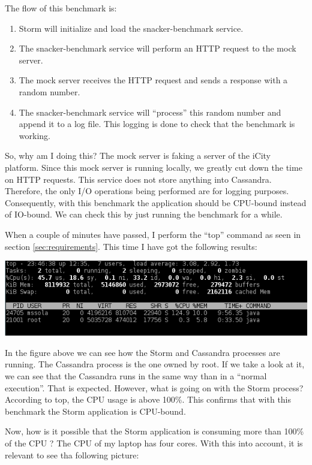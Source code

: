 The flow of this benchmark is:

\begin{enumerate}
  \itemsep0em
  \item Storm will initialize and load the snacker-benchmark service.
  \item The snacker-benchmark service will perform an HTTP request to the mock
server.
  \item The mock server receives the HTTP request and sends a response with a
random number.
  \item The snacker-benchmark service will ``process'' this random number and
append it to a log file. This logging is done to check that the benchmark is
working.
\end{enumerate}

So, why am I doing this? The mock server is faking a server of the iCity
platform. Since this mock server is running locally, we greatly cut down
the time on HTTP requests. This service does not store anything into Cassandra.
Therefore, the only I/O operations being performed are for logging purposes.
Consequently, with this benchmark the application should be CPU-bound instead
of IO-bound. We can check this by just running the benchmark for a while.

When a couple of minutes have passed, I perform the ``top'' command as seen in
section \ref{sec:requirements}. This time I have got the following results:

\begin{center}
  \includegraphics[scale=0.9]{hardware/images/total.png}
\end{center}

In the figure above we can see how the Storm and Cassandra processes are
running. The Cassandra process is the one owned by root. If we take a look at
it, we can see that the Cassandra runs in the same way than in a ``normal
execution''. That is expected. However, what is going on with the Storm
process? According to top, the CPU usage is above 100\%. This confirms that
with this benchmark the Storm application is CPU-bound.

Now, how is it possible that the Storm application is consuming more than 100\%
of the CPU ? The CPU of my laptop has four cores. With this into account, it is
relevant to see tha following picture:

